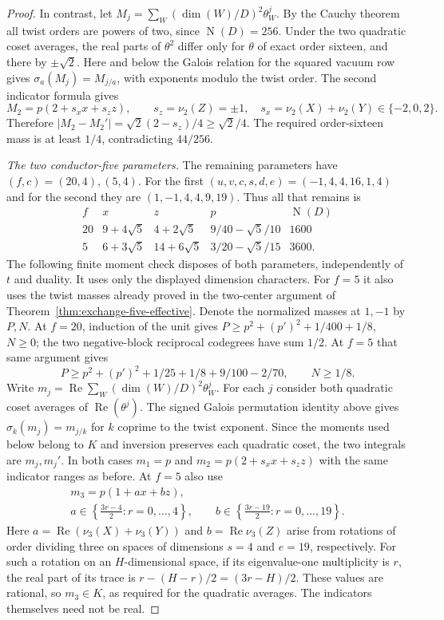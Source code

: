 \documentclass[11pt,a4paper]{article}
\numberwithin{equation}{section}
\begin{document}
\begin{proof}
In contrast, let $M_j=\sum_W(\dim(W)/D)^2\theta_W^j$. By the Cauchy theorem all twist orders are powers of two, since $\operatorname{N}(D)=256$. Under the two quadratic coset averages, the real parts of $\theta^2$ differ only for $\theta$ of exact order sixteen, and there by $\pm\sqrt2$. Here and below the Galois relation for the squared vacuum row gives $\sigma_a(M_j)=M_{j/a}$, with exponents modulo the twist order. The second indicator formula gives
\[
 M_2=p(2+s_x x+s_z z),\qquad s_z=\nu_2(Z)=\pm1,\quad
 s_x=\nu_2(X)+\nu_2(Y)\in\{-2,0,2\}.
\]
Therefore $|M_2-M_2'|=\sqrt2(2-s_z)/4\ge\sqrt2/4$. The required order-sixteen mass is at least $1/4$, contradicting $44/256$.

\par\smallskip\noindent\emph{The two conductor-five parameters.}\enspace
The remaining parameters have $(f,c)=(20,4),(5,4)$. For the first $(u,v,c,s,d,e)=(-1,4,4,16,1,4)$ and for the second they are $(1,-1,4,4,9,19)$. Thus all that remains is
\[
\begin{array}{c|c|c|c|c}
 f&x&z&p&\operatorname{N}(D)\\\hline
 20&9+4\sqrt5&4+2\sqrt5&9/40-\sqrt5/10&1600\\
 5&6+3\sqrt5&14+6\sqrt5&3/20-\sqrt5/15&3600 .
\end{array}
\]
The following finite moment check disposes of both parameters, independently of $t$ and duality. It uses only the displayed dimension characters. For $f=5$ it also uses the twist masses already proved in the two-center argument of Theorem~\ref{thm:exchange-five-effective}. Denote the normalized masses at $1,-1$ by $P,N$. At $f=20$, induction of the unit gives $P\ge p^2+(p')^2+1/400+1/8$, $N\ge0$; the two negative-block reciprocal codegrees have sum $1/2$. At $f=5$ that same argument gives
\[
 P\ge p^2+(p')^2+1/25+1/8+9/100-2/70,\qquad N\ge1/8.
\]
Write $m_j=\operatorname{Re}\sum_W(\dim(W)/D)^2\theta_W^j$.
For each $j$ consider both quadratic coset averages of
$\operatorname{Re}(\theta^j)$. The signed Galois permutation identity
above gives $\sigma_k(m_j)=m_{j/k}$ for $k$ coprime to the twist
exponent. Since the moments used below belong to $K$ and inversion
preserves each quadratic coset, the two integrals are $m_j,m_j'$.
In both cases $m_1=p$ and $m_2=p(2+s_xx+s_z z)$ with the same
indicator ranges as before. At $f=5$ also use
\[
 \begin{gathered}
 m_3=p(1+a x+b z),\\
 a\in\left\{\frac{3r-4}{2}:r=0,\ldots,4\right\},\qquad
 b\in\left\{\frac{3r-19}{2}:r=0,\ldots,19\right\}.
 \end{gathered}
\]
Here $a=\operatorname{Re}(\nu_3(X)+\nu_3(Y))$ and
$b=\operatorname{Re}\nu_3(Z)$ arise from rotations of order dividing
three on spaces of dimensions $s=4$ and $e=19$, respectively.
For such a rotation on an $H$-dimensional space, if its eigenvalue-one
multiplicity is $r$, the real part of its trace is
$r-(H-r)/2=(3r-H)/2$. These values are rational, so $m_3\in K$,
as required for the quadratic averages. The indicators themselves
need not be real.


\end{proof}
\end{document}
